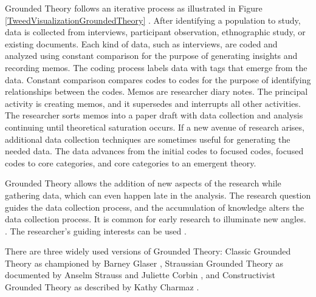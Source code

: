 Grounded Theory follows an iterative process as illustrated in Figure \ref{TweedVisualizationGroundedTheory} \cite{TweedGroundedTheory}. After identifying a population to study, data is collected from interviews, participant observation, ethnographic study, or existing documents. Each kind of data, such as interviews, are coded and analyzed using constant comparison for the purpose of generating insights and recording memos. The coding process labels data with tags that emerge from the data. Constant comparison compares codes to codes for the purpose of identifying relationships between the codes. Memos are researcher diary notes. The principal activity is creating memos, and it supersedes and interrupts all other activities. The researcher sorts memos into a paper draft with data collection and analysis continuing until theoretical saturation occurs. If a new avenue of research arises,  additional data collection techniques are sometimes useful for generating the needed data. The data advances from the initial codes to focused codes, focused codes to core categories, and core categories to an emergent theory. 


Grounded Theory allows the addition of new aspects of the research while gathering data, which can even happen late in the analysis. The research question guides the data collection process, and the accumulation of knowledge alters the data collection process. It is common for early research to illuminate new angles.  \cite{Charmaz}. The researcher's guiding interests can be used  \cite{Charmaz}.

There are three widely used versions of Grounded Theory: Classic Grounded Theory as championed by Barney Glaser \cite{GlaserDiscovery}, Straussian Grounded Theory as documented by Anselm Strauss and Juliette Corbin \cite{Strauss1988Basics}, and Constructivist Grounded Theory as described by Kathy Charmaz \cite{Charmaz}. 

